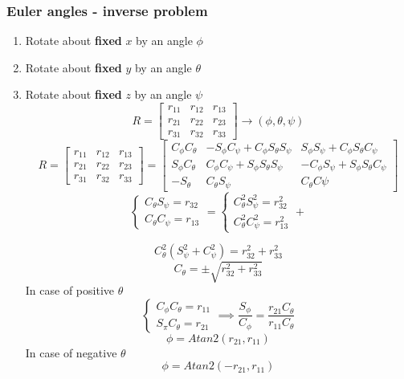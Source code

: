 \documentclass{article}
\begin{document}
\subsubsection{Euler angles - inverse problem}
    \begin{enumerate}
        \item Rotate about \textbf{fixed} $x$ by an angle $\phi$
        \item Rotate about \textbf{fixed} $y$ by an angle $\theta$
        \item Rotate about \textbf{fixed} $z$ by an angle $\psi$\\
        $$ R =
        \begin{bmatrix}
        r_{11} & r_{12} & r_{13} \\
        r_{21} & r_{22} & r_{23} \\
        r_{31} & r_{32} & r_{33}
        \end{bmatrix} \xrightarrow[]{} { (\phi,  \theta, \psi) }
        $$
        $$
        R =
        \begin{bmatrix}
        r_{11} & r_{12} & r_{13} \\
        r_{21} & r_{22} & r_{23} \\
        r_{31} & r_{32} & r_{33}
        \end{bmatrix} =
        \begin{bmatrix}
        C_\phi C_\theta & -S_\phi C_\psi + C_\phi S_\theta S_\psi & S_\phi S_\psi + C_\phi S_\theta C_\psi \\
        S_\phi C_\theta & C_\phi C_\psi + S_\phi S_\theta S_\psi & -C_\phi S_\psi + S_\phi S_\theta C_\psi \\
        -S_\theta & C_\theta S_\psi & C_\theta C\psi
        \end{bmatrix}
    $$
    \begin{equation}
    \begin{cases}
         C_\theta S_\psi = r_{32} \\
         C_\theta C_\psi = r_{13}
    \end{cases} =
    \begin{cases}
         C^{2}_\theta S^{2}_\psi = r^{2}_{32} \\
         C^{2}_\theta C^{2}_\psi = r^{2}_{13}
    \end{cases} +
    \end{equation}


    $$C^{2}_{\theta}(S^{2}_{\psi}+C^{2}_\psi) = r^{2}_{32} + r^{2}_{33} $$
    $$ C_\theta = \pm\sqrt{r^{2}_{32} + r^{2}_{33}} $$
In case of positive $\theta$
    \begin{equation}
    \begin{cases}
         C_\phi C_\theta = r_{11} \\
         S_\pi C_\theta = r_{21}
    \end{cases} \implies
     \frac{S_\phi}{C_\phi} = \frac{r_{21} C_\theta}{r_{11} C_\theta}
    \end{equation}
    $$ \phi = Atan2(r_{21},r_{11}) $$
In case of negative $\theta$
    $$ \phi = Atan2(-r_{21},r_{11}) $$



\end{enumerate}
\end{document}
